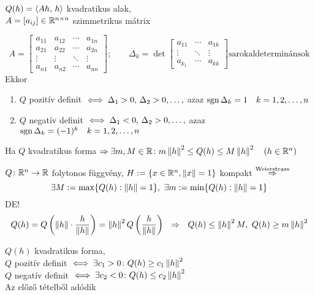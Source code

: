 \begin{te}$Q(h) = \langle Ah,\,h\rangle$ kvadratikus alak,\\$A=[a_{ij}]\in\mathbb{R}^{n\times n}$ szimmetrikus
  mátrix
  
  \[A=\begin{bmatrix}a_{11} & a_{12} & \cdots & a_{1n}\\
  a_{21} & a_{22} & \cdots & a_{2n}\\ \vdots & \vdots & \ddots & \vdots \\
  a_{n1} & a_{n2} & \cdots & a_{nn}\end{bmatrix};\qquad \Delta_k = \det\begin{bmatrix}a_{11}&\cdots&a_{1k}\\
  \vdots &\ddots& \vdots\\a_{k_1} & \cdots & a_{kk}\end{bmatrix} \text{sarokaldeterminánsok}\]
Ekkor
\begin{enumerate}
\item $Q$ pozitív definit $\iff\Delta_1>0,\,\Delta_2>0,\dotsc,$ azaz $\operatorname{sgn}\Delta_k=1\quad k=1,2,\dotsc,n$
\item $Q$ negatív definit $\iff\Delta_1<0,\,\Delta_2>0,\dotsc,$ azaz $\operatorname{sgn}\Delta_k=(-1)^k \quad k=1,2,\dotsc,n$
\end{enumerate}
\end{te}

\begin{te}
  Ha $Q$ kvadratikus forma $\Rightarrow\\\exists m,M\in\mathbb{R}\colon m\left\Vert h\right\Vert^2\leq Q(h)\leq M\left\Vert h\right\Vert^2\quad(h\in\mathbb{R}^n)$
\end{te}
\begin{biz}
  $Q\colon \mathbb{R}^n\to\mathbb{R}$ folytonos függvény, $H:=\{x\in\mathbb{R}^n,\left\Vert x\right\Vert = 1\}$ kompakt $\stackrel{\text{Weierstrass}}{\Rightarrow}$\\
  \[\exists M:=\max\{Q(h) : \norma h = 1\},\ \exists m:=\min\{Q(h) : \norma h = 1\}\]
  DE!\\
  \[Q(h) =  Q\left(\norma{h}\cdot\dfrac{h}{\norma{h}}\right) = \norma{h}^2Q\left(\dfrac{h}{\norma{h}}\right)\ \ \nn\ 
  \ Q(h)\leq \norma{h}^2 M,\ Q(h)\geq m\norma{h}^2\]
\end{biz}

\begin{kov}
  $Q(h)$ kvadratikus forma,\\
  $Q$ pozitív definit $\iff \exists c_1>0\colon Q(h)\geq c_1\left\Vert h\right\Vert^2$\\
  $Q$ negatív definit $\iff \exists c_2<0\colon Q(h)\leq c_2\left\Vert h\right\Vert^2$\\
  Az előző tételből adódik
\end{kov}

